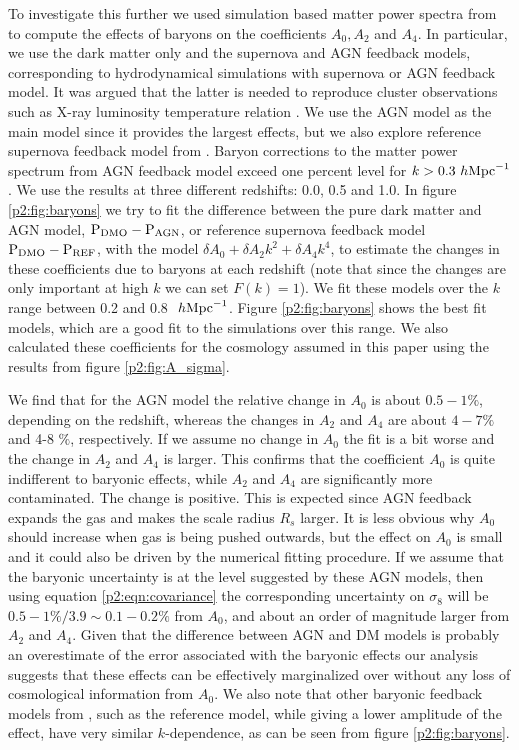 \documentclass[
  11pt,
  twoside,
  openright,
  titlepage,
  headings=optiontoheadandtoc
]{scrbook}
\begin{document}
To investigate this further we used simulation based matter power spectra from \cite{2011MNRAS.415.3649V} to compute
the effects of baryons on the coefficients $A_0, A_2$ and $A_4$. In particular, we use the dark matter only 
 and the supernova and AGN feedback models, corresponding to hydrodynamical simulations with supernova or
AGN feedback model. It was argued that the latter is needed to reproduce 
cluster observations such as X-ray luminosity temperature 
relation \citep{2010MNRAS.406..822M}. We use the AGN model as the main model 
since it provides the largest effects, but we also explore reference supernova feedback model from 
\cite{2011MNRAS.415.3649V}. 
Baryon corrections to the matter power spectrum from AGN feedback model 
exceed one percent level for $k> 0.3 \ h \rm{Mpc}^{-1}$ \citep{2011MNRAS.415.3649V}. 
We use the results at three different redshifts: 0.0, 0.5 and 1.0. In figure \ref{p2:fig:baryons} we try to fit the difference between the pure dark matter and AGN model, $\rm{P_{DMO} - P_{AGN}}$, or reference supernova feedback
model $\rm{P_{DMO} - P_{REF}}$, with the model
$\delta A_0 + \delta A_2k^2 + \delta A_4 k^4$, 
to estimate the changes in these coefficients due to baryons at
each redshift (note that since the changes are only important at high $k$ we can set 
$F(k)=1$). We fit these models over the $k$ range between 0.2 and 0.8 $\ h \rm{Mpc}^{-1}$. Figure \ref{p2:fig:baryons} 
shows the best fit models, which are a good fit to the simulations over this range. 
We also calculated these coefficients for the cosmology assumed in this paper using the results from figure \ref{p2:fig:A_sigma}.

We find that for the AGN model the relative change in $A_0$ is about $0.5-1\%$, depending on the redshift, 
whereas the changes in $A_2$ and $A_4$ are about $4-7\%$ and 4-8 $\%$, respectively. 
If we assume no change in $A_0$ the fit is a bit worse and
the change in $A_2$ and $A_4$ is larger. 
This confirms that the coefficient $A_0$ is quite indifferent to baryonic effects, while
$A_2$ and $A_4$ are significantly more contaminated. 
The change is positive. This is expected since AGN feedback expands 
the gas and makes the scale radius $R_s$ larger. It is less obvious why $A_0$ should increase when gas is being pushed 
outwards, but the effect on $A_0$ is small and it could also be driven by the numerical fitting procedure. 
If we assume that the baryonic uncertainty is at the level suggested by these AGN models, then using 
equation \ref{p2:eqn:covariance} the 
corresponding uncertainty on $\sigma_8$ will be $0.5-1\%/3.9 \sim 0.1-0.2\%$ from $A_0$, and about an 
order of magnitude larger from $A_2$ and $A_4$. Given that the difference between AGN and DM models is probably 
an overestimate of the error associated with the baryonic effects our analysis
suggests that these effects can be effectively 
marginalized over without any loss of cosmological information from $A_0$. 
We also note that other baryonic feedback models from \cite{2011MNRAS.415.3649V}, such as the 
reference model, while giving a lower amplitude of 
the effect, have very similar $k$-dependence, as can be seen from figure \ref{p2:fig:baryons}. 
\end{document}
